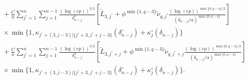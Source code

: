 \documentclass[aos]{imsart}
\begin{document}
\begin{appendix}
\begin{equation*}
\begin{aligned}
    & \quad + \frac{C}{n} \sum_{j^\circ=1}^n \sum_{j=1}^{n-1} \frac{(\log(ep))^{3/2}}{\delta_{n-j}^3} 
    \left[ 
        \tilde{L}_{3,j^\circ} 
        + \phi^{\min\{1, q-3\}} \tilde\nu_{q,j^\circ} \frac{ {(\log(ep))}^{\max\{0, q-4\}/2}}{(\delta_{n-j}/\alpha)^{\max\{0, q-4\}}}
    \right] \\ 
    & \quad \times \min\{1, \kappa_{j^\circ+(3,j-3)|\{j^\circ+3,j^\circ+j-3\}}(\delta_{n-j}^\circ) + \kappa^\circ_{j}(\delta_{n-j})\} \\
    & \quad + \frac{C}{n} \sum_{j^\circ=1}^n \sum_{j=1}^{n-1} \frac{(\log(ep))^{3/2}}{\delta_{n-j}^3}  
    \left[ 
        \tilde{L}_{3,j^\circ+j}
        + \phi^{\min\{1, q-3\}} \tilde\nu_{q,j^\circ+j} \frac{ {(\log(ep))}^{\max\{0, q-4\}/2}}{(\delta_{n-j}/\alpha)^{\max\{0, q-4\}}}
    \right] \\
    & \quad \times \min\{1, \kappa_{j^\circ+(3,j-3)|\{j^\circ+3,j^\circ+j-3\}}(\delta_{n-j}^\circ) + \kappa^\circ_{j}(\delta_{n-j})\}. \\
\end{aligned}
\end{equation*}





\end{appendix}
\end{document}
